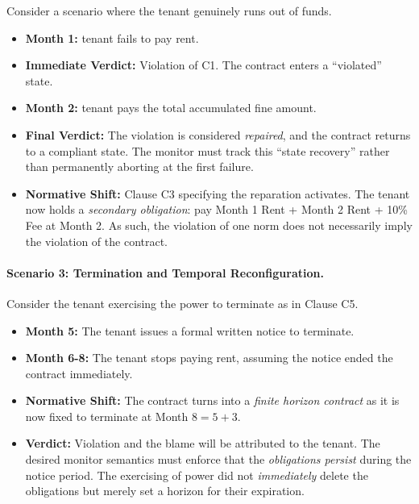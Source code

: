 Consider a scenario where the tenant genuinely runs out of funds.

\begin{itemize}

    \item \textbf{Month 1:} tenant fails to pay rent.

    \item \textbf{Immediate Verdict:} Violation of C1. The contract enters a ``violated'' state.

    \item \textbf{Month 2:} tenant pays the total accumulated fine amount.

    \item \textbf{Final Verdict:} The violation is considered \emph{repaired}, and the contract returns to a compliant state. The monitor must track this ``state recovery'' rather than permanently aborting at the first failure.

\item \textbf{Normative Shift:} Clause C3 specifying the reparation activates. The tenant now holds a \emph{secondary obligation}: pay Month 1 Rent + Month 2 Rent + 10\% Fee at Month 2. As such, the violation of one norm does not necessarily imply the violation of the contract.

\end{itemize}



\paragraph{Scenario 3: Termination and Temporal Reconfiguration.}

Consider the tenant exercising the power to terminate as in Clause C5.

\begin{itemize}

    \item \textbf{Month 5:} The tenant issues a formal written notice to terminate.

    \item \textbf{Month 6-8:} The tenant stops paying rent, assuming the notice ended the contract immediately.

  \item \textbf{Normative Shift:}  The contract turns into a \emph{finite horizon contract} as it is now fixed to terminate at Month $8=5+3$. 

    \item \textbf{Verdict:} Violation and the blame will be attributed to the tenant. The desired monitor semantics must enforce that the \emph{obligations persist} during the notice period. The exercising of power did not \emph{immediately} delete the obligations but merely set a horizon for their expiration.

\end{itemize}



